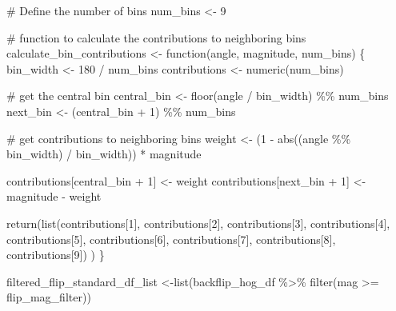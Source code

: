 \documentclass[
  letterpaper,
  DIV=11,
  numbers=noendperiod]{scrreprt}
\newenvironment{Shaded}{\begin{snugshade}}{\end{snugshade}}
\newcommand{\CommentTok}[1]{\textcolor[rgb]{0.37,0.37,0.37}{#1}}
\newcommand{\ControlFlowTok}[1]{\textcolor[rgb]{0.00,0.23,0.31}{#1}}
\newcommand{\DecValTok}[1]{\textcolor[rgb]{0.68,0.00,0.00}{#1}}
\newcommand{\FunctionTok}[1]{\textcolor[rgb]{0.28,0.35,0.67}{#1}}
\newcommand{\NormalTok}[1]{\textcolor[rgb]{0.00,0.23,0.31}{#1}}
\newcommand{\OtherTok}[1]{\textcolor[rgb]{0.00,0.23,0.31}{#1}}
\newcommand{\SpecialCharTok}[1]{\textcolor[rgb]{0.37,0.37,0.37}{#1}}
\begin{document}
\begin{Shaded}
\begin{Highlighting}[]
\CommentTok{\# Define the number of bins}
\NormalTok{num\_bins }\OtherTok{\textless{}{-}} \DecValTok{9}

\CommentTok{\# function to calculate the contributions to neighboring bins}
\NormalTok{calculate\_bin\_contributions }\OtherTok{\textless{}{-}} \ControlFlowTok{function}\NormalTok{(angle, magnitude, num\_bins) \{}
\NormalTok{  bin\_width }\OtherTok{\textless{}{-}} \DecValTok{180} \SpecialCharTok{/}\NormalTok{ num\_bins}
\NormalTok{  contributions }\OtherTok{\textless{}{-}} \FunctionTok{numeric}\NormalTok{(num\_bins)}
  
  \CommentTok{\# get the central bin}
\NormalTok{  central\_bin }\OtherTok{\textless{}{-}} \FunctionTok{floor}\NormalTok{(angle }\SpecialCharTok{/}\NormalTok{ bin\_width) }\SpecialCharTok{\%\%}\NormalTok{ num\_bins}
\NormalTok{  next\_bin }\OtherTok{\textless{}{-}}\NormalTok{ (central\_bin }\SpecialCharTok{+} \DecValTok{1}\NormalTok{) }\SpecialCharTok{\%\%}\NormalTok{ num\_bins}
  
  \CommentTok{\# get contributions to neighboring bins}
\NormalTok{  weight }\OtherTok{\textless{}{-}}\NormalTok{ (}\DecValTok{1} \SpecialCharTok{{-}} \FunctionTok{abs}\NormalTok{((angle }\SpecialCharTok{\%\%}\NormalTok{ bin\_width) }\SpecialCharTok{/}\NormalTok{ bin\_width)) }\SpecialCharTok{*}\NormalTok{ magnitude}
  
\NormalTok{  contributions[central\_bin }\SpecialCharTok{+} \DecValTok{1}\NormalTok{] }\OtherTok{\textless{}{-}}\NormalTok{ weight}
\NormalTok{  contributions[next\_bin }\SpecialCharTok{+} \DecValTok{1}\NormalTok{] }\OtherTok{\textless{}{-}}\NormalTok{ magnitude }\SpecialCharTok{{-}}\NormalTok{ weight}
  
  \FunctionTok{return}\NormalTok{(}\FunctionTok{list}\NormalTok{(contributions[}\DecValTok{1}\NormalTok{],}
\NormalTok{         contributions[}\DecValTok{2}\NormalTok{],}
\NormalTok{         contributions[}\DecValTok{3}\NormalTok{],}
\NormalTok{         contributions[}\DecValTok{4}\NormalTok{],}
\NormalTok{         contributions[}\DecValTok{5}\NormalTok{],}
\NormalTok{         contributions[}\DecValTok{6}\NormalTok{],}
\NormalTok{         contributions[}\DecValTok{7}\NormalTok{],}
\NormalTok{         contributions[}\DecValTok{8}\NormalTok{],}
\NormalTok{         contributions[}\DecValTok{9}\NormalTok{])}
\NormalTok{         )}
\NormalTok{\}}

\NormalTok{filtered\_flip\_standard\_df\_list }\OtherTok{\textless{}{-}}\FunctionTok{list}\NormalTok{(backflip\_hog\_df }\SpecialCharTok{\%\textgreater{}\%}
                                        \FunctionTok{filter}\NormalTok{(mag }\SpecialCharTok{\textgreater{}=}\NormalTok{ flip\_mag\_filter))}


\end{Highlighting}
\end{Shaded}
\end{document}
